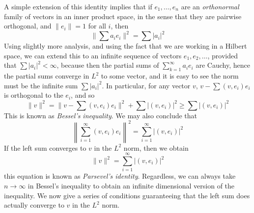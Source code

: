 A simple extension of this identity implies that if $e_1, \dots, e_n$ are an {\it orthonormal} family of vectors in an inner product space, in the sense that they are pairwise orthogonal, and $\| e_i \| = 1$ for all $i$, then
%
\[ \| \sum a_ie_i \|^2 = \sum |a_i|^2 \]
%
Using slightly more analysis, and using the fact that we are working in a Hilbert space, we can extend this to an infinite sequence of vectors $e_1, e_2, \dots$, provided that $\sum |a_i|^2 < \infty$, because then the partial sums of $\sum_{k = 1}^\infty a_ie_i$ are Cauchy, hence the partial sums converge in $L^2$ to some vector, and it is easy to see the norm must be the infinite sum $\sum |a_i|^2$. In particular, for any vector $v$, $v - \sum (v,e_i) e_i$ is orthogonal to the $e_i$, and so
%
\[ \| v \|^2 = \| v - \sum (v,e_i) e_i \|^2 +\sum |(v,e_i)|^2 \geq \sum |(v,e_i)|^2 \]
%
This is known as {\it Bessel's inequality}. We may also conclude that
%
\[ \left\| \sum_{i = 1}^\infty (v,e_i) e_i \right\|^2 = \sum_{i = 1}^\infty |(v,e_i)|^2 \]
%
If the left sum converges to $v$ in the $L^2$ norm, then we obtain
%
\[ \| v \|^2 = \sum_{i = 1}^\infty |(v,e_i)|^2 \]
%
this equation is known as {\it Parsevel's identity}. Regardless, we can always take $n \to \infty$ in Bessel's inequality to obtain an infinite dimensional version of the inequality. We now give a series of conditions guaranteeing that the left sum does actually converge to $v$ in the $L^2$ norm.

